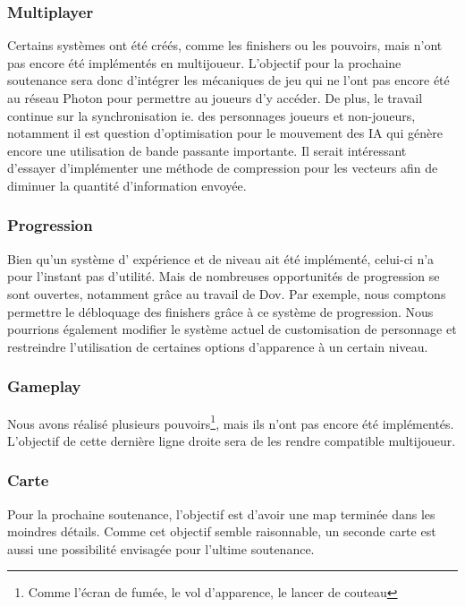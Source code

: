 	\subsubsection{Multiplayer}
	Certains systèmes ont été créés, comme les finishers ou les pouvoirs, mais n'ont pas encore été 
	implémentés en multijoueur. L'objectif pour la prochaine soutenance sera donc d'intégrer les mécaniques 
	de jeu qui ne l'ont pas encore été au réseau Photon pour permettre au joueurs d'y accéder. De plus, le 
	travail continue sur la synchronisation ie. des personnages joueurs et non-joueurs, notamment il est 
	question d'optimisation pour le mouvement des IA qui génère encore une utilisation de bande passante importante. 
	Il serait intéressant d'essayer d'implémenter une méthode de compression pour les vecteurs afin de diminuer 
	la quantité d'information envoyée.

	\subsubsection{Progression}
		Bien qu'un système d' expérience et de niveau ait été implémenté, celui-ci n'a pour 
		l'instant pas d'utilité. Mais de nombreuses opportunités de progression se sont ouvertes, 
		notamment grâce au travail de Dov. Par exemple, nous comptons permettre le débloquage des 
		finishers grâce à ce système de progression. Nous pourrions également modifier le système actuel 
		de customisation de personnage et restreindre l'utilisation de certaines options d'apparence à un certain niveau.

	\subsubsection{Gameplay}

	Nous avons réalisé plusieurs pouvoirs\footnote{Comme l'écran de fumée, le vol d'apparence, le lancer de couteau}, mais ils n'ont pas encore été implémentés.
	L'objectif de cette dernière ligne droite sera de les rendre compatible multijoueur.
	
	\subsubsection{Carte}

	Pour la prochaine soutenance, l'objectif est d'avoir une map terminée dans les moindres 
	détails. Comme cet objectif semble raisonnable, un seconde carte est aussi une possibilité 
	envisagée pour l'ultime soutenance.